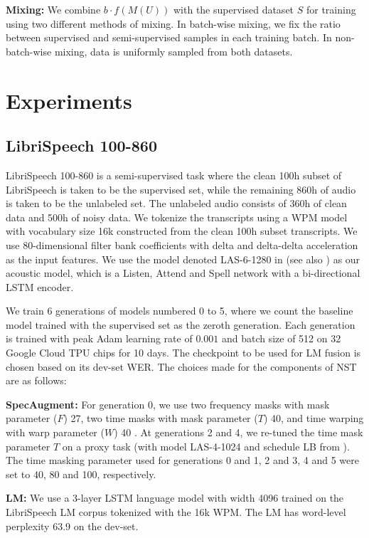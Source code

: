 \documentclass[a4paper]{article}
\begin{document}
\noindent\textbf{Mixing: }
We combine  $b \cdot f (M(U))$ with the supervised dataset $S$ for training using two different methods of mixing. In batch-wise mixing, we fix the ratio between supervised and semi-supervised samples in each training batch. In non-batch-wise mixing, data is uniformly sampled from both datasets.

\section{Experiments}

\subsection{LibriSpeech 100-860}
\label{s:100-860}
LibriSpeech 100-860 is a semi-supervised task where the clean 100h subset of LibriSpeech \cite{librispeech} is taken to be the supervised set, while the remaining 860h of audio is taken to be the unlabeled set. The unlabeled audio consists of 360h of clean data and 500h of noisy data. We tokenize the transcripts using a WPM model \cite{wpm} with vocabulary size 16k constructed from the clean 100h subset transcripts. We use 80-dimensional filter bank coefficients with delta and delta-delta acceleration as the input features. We use the model denoted LAS-6-1280 in \cite{specaugment} (see also \cite{lasbaseline}) as our acoustic model, which is a Listen, Attend and Spell network \cite{LAS} with a bi-directional LSTM encoder.

We train 6 generations of models numbered 0 to 5, where we count the baseline model trained with the supervised set as the zeroth generation. Each generation is trained with peak Adam learning rate of $0.001$ and batch size of 512 on 32 Google Cloud TPU chips for 10 days. The checkpoint to be used for LM fusion is chosen based on its dev-set WER. The choices made for the components of NST are as follows:

\noindent\textbf{SpecAugment:} For generation 0, we use two frequency masks with mask parameter ($F$) 27, two time masks with mask parameter ($T$) 40, and time warping with warp parameter ($W$) 40 \cite{specaugment}. At generations 2 and 4, we re-tuned the time mask parameter $T$ on a proxy task (with model LAS-4-1024 and schedule LB from \cite{specaugment}). The time masking parameter used for generations 0 and 1, 2 and 3, 4 and 5 were set to 40, 80 and 100, respectively.

\noindent\textbf{LM:} We use a 3-layer LSTM language model with width 4096 trained on the LibriSpeech LM corpus tokenized with the 16k WPM. The LM has word-level perplexity 63.9 on the dev-set.
\end{document}
